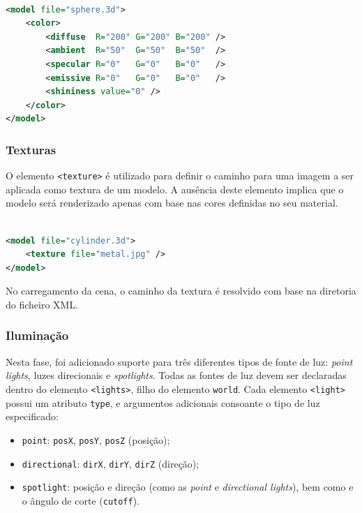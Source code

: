 \documentclass[12pt, a4paper]{article}
\begin{document}
\begin{lstlisting}[language=xml]

<model file="sphere.3d">
    <color>
        <diffuse  R="200" G="200" B="200" />
        <ambient  R="50"  G="50"  B="50"  />
        <specular R="0"   G="0"   B="0"   />
        <emissive R="0"   G="0"   B="0"   />
        <shininess value="0" />
    </color>
</model>
\end{lstlisting}

\subsubsection{Texturas}

O elemento \texttt{<texture>} é utilizado para definir o caminho para uma imagem a ser aplicada como
textura de um modelo. A ausência deste elemento implica que o modelo será renderizado apenas com
base nas cores definidas no seu material.

\begin{lstlisting}[language=xml]

<model file="cylinder.3d">
    <texture file="metal.jpg" />
</model>
\end{lstlisting}

No carregamento da cena, o caminho da textura é resolvido com base na diretoria do ficheiro XML.

\subsubsection{Iluminação}

Nesta fase, foi adicionado suporte para três diferentes tipos de fonte de luz: \emph{point lights},
luzes direcionais e \emph{spotlights}. Todas as fontes de luz devem ser declaradas dentro do
elemento \texttt{<lights>}, filho do elemento \texttt{world}. Cada elemento \texttt{<light>} possui
um atributo \texttt{type}, e argumentos adicionais consoante o tipo de luz especificado:

\begin{itemize}
    \item \texttt{point}: \texttt{posX}, \texttt{posY}, \texttt{posZ} (posição);
    \item \texttt{directional}: \texttt{dirX}, \texttt{dirY}, \texttt{dirZ} (direção);
    \item \texttt{spotlight}: posição e direção (como as \emph{point} e \emph{directional lights}),
        bem como e o ângulo de corte (\texttt{cutoff}).
\end{itemize}
\end{document}
